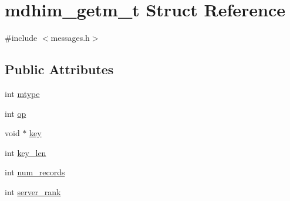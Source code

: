\hypertarget{structmdhim__getm__t}{\section{mdhim\-\_\-getm\-\_\-t Struct Reference}
\label{d9/d54/structmdhim__getm__t}
}


{\ttfamily \#include $<$messages.\-h$>$}

\subsection*{Public Attributes}
\begin{DoxyCompactItemize}
\item 
int \hyperlink{structmdhim__getm__t_a803aef9942bd6bd39d10c22f4f1205d3}{mtype}
\item 
int \hyperlink{structmdhim__getm__t_a81dd92f402e433928b8b3bae7ccdefd8}{op}
\item 
void $\ast$ \hyperlink{structmdhim__getm__t_a53c3aff6037a3e693e09ff4e98bd7eba}{key}
\item 
int \hyperlink{structmdhim__getm__t_a8942a21db02e749c3f3b04b32fea795e}{key\-\_\-len}
\item 
int \hyperlink{structmdhim__getm__t_ad585955cf1b7a3ffce40fc44062583e9}{num\-\_\-records}
\item 
int \hyperlink{structmdhim__getm__t_a2fe10e46b27b008657d3c59299ea1fd6}{server\-\_\-rank}
\end{DoxyCompactItemize}


